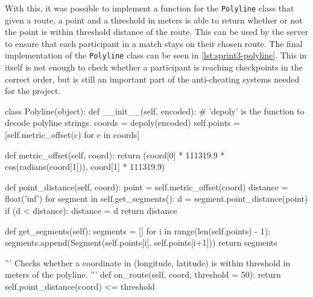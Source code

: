 With this, it was possible to implement a function for the \texttt{Polyline} class that given a route, a point and a threshold in meters is able to return whether or not the point is within threshold distance of the route. This can be used by the server to ensure that each participant in a match stays on their chosen route. The final implementation of the \texttt{Polyline} class can be seen in \autoref{lst:sprint3-polyline}. This in itself is not enough to check whether a participant is reaching checkpoints in the correct order, but is still an important part of the anti-cheating systems needed for the project.

\begin{code}[label={lst:sprint3-polyline}, caption={The \texttt{Polyline} Class}, language={Python}, style={PythonDoc}]
class Polyline(object):
	def __init__(self, encoded):
		# 'depoly' is the function to decode polyline strings.
		coords = depoly(encoded)
		self.points = [self.metric_offset(c) for c in coords]

	def metric_offset(self, coord):
		return (coord[0] * 111319.9 * cos(radians(coord[1])), coord[1] * 111319.9)

	def point_distance(self, coord):
		point = self.metric_offset(coord)
		distance = float('inf')
		for segment in self.get_segments():
			d = segment.point_distance(point)
			if (d < distance):
			distance = d
		return distance

	def get_segments(self):
		segments = []
		for i in range(len(self.points) - 1):
			segments.append(Segment(self.points[i], self.points[i+1]))
		return segments

	'''
	Checks whether a coordinate in (longitude, latitude) is within threshold in meters of the polyline.
	'''
	def on_route(self, coord, threshold = 50):
		return self.point_distance(coord) <= threshold
\end{code}
